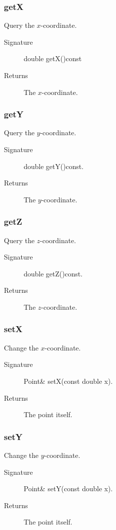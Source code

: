 \subsubsection{getX}
Query the $x$-coordinate.
\begin{description}
  \item[Signature] double getX()const
  \item[Returns] The $x$-coordinate.
\end{description}

\subsubsection{getY}
Query the $y$-coordinate. 
\begin{description}
  \item[Signature] double getY()const.
  \item[Returns] The $y$-coordinate.
\end{description}

\subsubsection{getZ}
Query the $z$-coordinate.
\begin{description}
  \item[Signature] double getZ()const.
  \item[Returns] The $z$-coordinate.
\end{description}

\subsubsection{setX}
Change the $x$-coordinate. 
\begin{description}
  \item[Signature] Point\& setX(const double x).
  \item[Returns] The point itself.
\end{description}

\subsubsection{setY}
Change the $y$-coordinate.
\begin{description}
   \item[Signature] Point\& setY(const double x).
  \item[Returns] The point itself.
\end{description}

